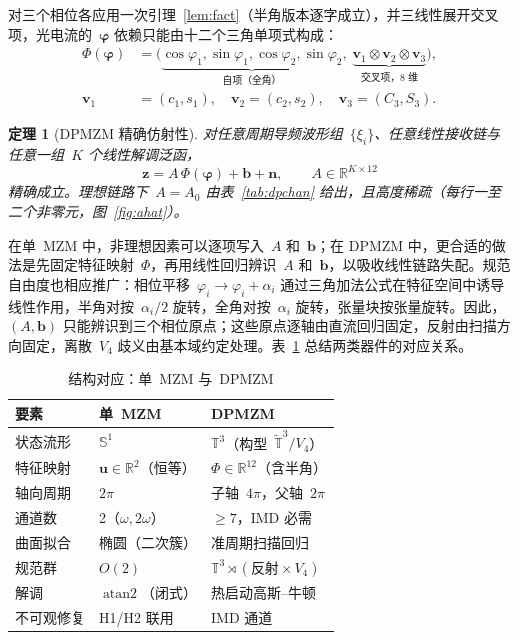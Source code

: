 \documentclass[11pt,journal,onecolumn]{IEEEtran}
\theoremstyle{plain}
\newtheorem{theorem}{定理}
\theoremstyle{remark}
\newcommand{\zv}{\mathbf{z}}
\newcommand{\uv}{\mathbf{u}}
\newcommand{\bv}{\mathbf{b}}
\newcommand{\nv}{\mathbf{n}}
\newcommand{\vv}{\mathbf{v}}
\newcommand{\phiv}{\bm{\varphi}}
\newcommand{\atan}{\operatorname{atan2}}
\begin{document}
对三个相位各应用一次引理~\ref{lem:fact}（半角版本逐字成立），并三线性展开交叉项，光电流的~$\phiv$ 依赖只能由十二个三角单项式构成：
\begin{align}
\Phi(\phiv)&=\bigl(\underbrace{\cos\varphi_1,\sin\varphi_1,
\cos\varphi_2,\sin\varphi_2}_{\text{自项（全角）}},\;
\underbrace{\vv_1{\otimes}\vv_2{\otimes}\vv_3}_{\text{交叉项，8 维}}
\bigr),\nonumber\\
\vv_1&=(c_1,s_1),\quad \vv_2=(c_2,s_2),\quad \vv_3=(C_3,S_3).
\label{eq:feature}
\end{align}

\begin{theorem}[DPMZM 精确仿射性]
\label{th:dpmzm}
对任意周期导频波形组~$\{\xi_i\}$、任意线性接收链与任意一组~$K$ 个线性解调泛函，
\begin{equation}
\zv=A\,\Phi(\phiv)+\bv+\nv,\qquad A\in\mathbb{R}^{K\times 12}
\label{eq:dpaffine}
\end{equation}
精确成立。理想链路下~$A=A_0$ 由表~\ref{tab:dpchan} 给出，且高度稀疏（每行一至二个非零元，图~\ref{fig:ahat}）。
\end{theorem}

在单~MZM 中，非理想因素可以逐项写入~$A$ 和~$\bv$；在 DPMZM 中，更合适的做法是先固定特征映射~$\Phi$，再用线性回归辨识~$A$ 和~$\bv$，以吸收线性链路失配。规范自由度也相应推广：相位平移~$\varphi_i\to\varphi_i+\alpha_i$ 通过三角加法公式在特征空间中诱导线性作用，半角对按~$\alpha_i/2$ 旋转，全角对按~$\alpha_i$ 旋转，张量块按张量旋转。因此，$(A,\bv)$ 只能辨识到三个相位原点；这些原点逐轴由直流回归固定，反射由扫描方向固定，离散~$V_4$ 歧义由基本域约定处理。表~\ref{tab:struct} 总结两类器件的对应关系。

\begin{table}[!t]
\caption{结构对应：单~MZM 与~DPMZM}
\label{tab:struct}
\centering
\footnotesize
\setlength{\tabcolsep}{3pt}
\begin{tabular}{lll}
\toprule
要素 & 单~MZM & DPMZM\\
\midrule
状态流形 & $\mathbb{S}^1$ & $\mathbb{T}^3$（构型~$\widetilde{\mathbb{T}}^3/V_4$）\\
特征映射 & $\uv\in\mathbb{R}^2$（恒等） & $\Phi\in\mathbb{R}^{12}$（含半角）\\
轴向周期 & $2\pi$ & 子轴~$4\pi$，父轴~$2\pi$\\
通道数 & 2（$\omega,2\omega$） & $\ge 7$，IMD 必需\\
曲面拟合 & 椭圆（二次簇） & 准周期扫描回归\\
规范群 & $O(2)$ & $\mathbb{T}^3\rtimes(\text{反射}\times V_4)$\\
解调 & $\atan$（闭式） & 热启动高斯--牛顿\\
不可观修复 & H1/H2 联用 & IMD 通道\\
\bottomrule
\end{tabular}
\end{table}
\end{document}
